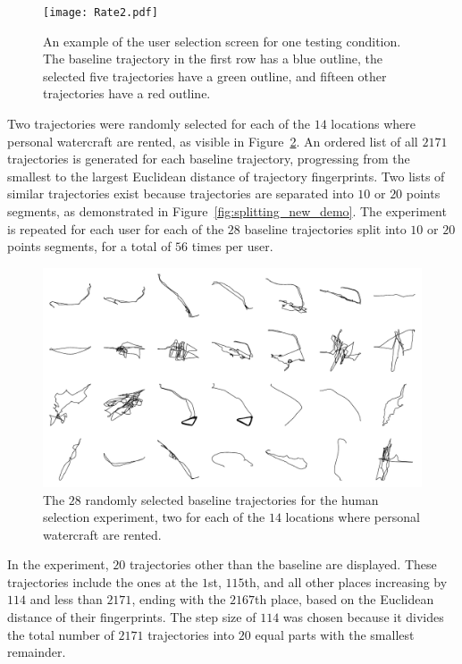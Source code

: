 \documentclass[preprint,12pt]{elsarticle}
\begin{document}
\begin{figure}[!ht]
    \centering
    \texttt{[image: Rate2.pdf]}
    \caption{An example of the user selection screen for one testing condition. The baseline trajectory in the first row has a blue outline, the selected five trajectories have a green outline, and fifteen other trajectories have a red outline.}
    \label{fig:user_select}
\end{figure}

Two trajectories were randomly selected for each of the $14$ locations where personal watercraft are rented, as visible in Figure~\ref{fig:baseline}. An ordered list of all $2171$ trajectories is generated for each baseline trajectory, progressing from the smallest to the largest Euclidean distance of trajectory fingerprints. Two lists of similar trajectories exist because trajectories are separated into $10$ or $20$ points segments, as demonstrated in Figure~\ref{fig:splitting_new_demo}. The experiment is repeated for each user for each of the $28$ baseline trajectories split into $10$ or $20$ points segments, for a total of $56$ times per user.

\begin{figure}[!ht]
    \centering
    \includegraphics[width = 0.99 \linewidth]{baseline.pdf}
    \caption{The $28$ randomly selected baseline trajectories for the human selection experiment, two for each of the $14$ locations where personal watercraft are rented.}
    \label{fig:baseline}
\end{figure}

In the experiment, $20$ trajectories other than the baseline are displayed. These trajectories include the ones at the $1$st, $115$th, and all other places increasing by $114$ and less than $2171$, ending with the $2167$th place, based on the Euclidean distance of their fingerprints. The step size of $114$ was chosen because it divides the total number of $2171$ trajectories into $20$ equal parts with the smallest remainder.
\end{document}

